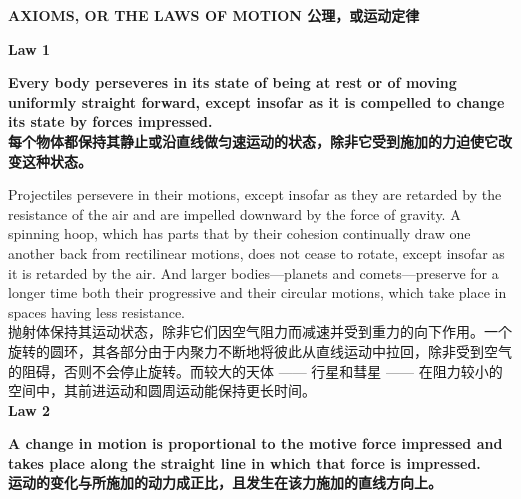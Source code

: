 \documentclass{article}
\begin{document}
\begin{center}
    \textbf{AXIOMS, OR THE LAWS OF MOTION 公理，或运动定律}
\end{center}

\noindent\textbf{Law 1}

\addtolength{\leftskip}{1cm}
\addtolength{\rightskip}{1cm}

\noindent \textbf{Every body perseveres in its state of being at rest or of moving uniformly straight forward, except insofar as it is compelled to change its state by forces impressed.}\\
\noindent \textbf{每个物体都保持其静止或沿直线做匀速运动的状态，除非它受到施加的力迫使它改变这种状态。}\\

\addtolength{\leftskip}{-1cm}
\addtolength{\rightskip}{-1cm}

\noindent Projectiles persevere in their motions, except insofar as they are retarded by the resistance of the air and are impelled downward by the force of gravity. A spinning hoop, which has parts that by their cohesion continually draw one another back from rectilinear motions, does not cease to rotate, except insofar as it is retarded by the air. And larger bodies—planets and comets—preserve for a longer time both their progressive and their circular motions, which take place in spaces having less resistance.\\
抛射体保持其运动状态，除非它们因空气阻力而减速并受到重力的向下作用。一个旋转的圆环，其各部分由于内聚力不断地将彼此从直线运动中拉回，除非受到空气的阻碍，否则不会停止旋转。而较大的天体 —— 行星和彗星 —— 在阻力较小的空间中，其前进运动和圆周运动能保持更长时间。\\

\noindent\textbf{Law 2}

\addtolength{\leftskip}{1cm}
\addtolength{\rightskip}{1cm}

\noindent \textbf{A change in motion is proportional to the motive force impressed and takes place along the straight line in which that force is impressed.}\\
\noindent \textbf{运动的变化与所施加的动力成正比，且发生在该力施加的直线方向上。}\\

\addtolength{\leftskip}{-1cm}
\addtolength{\rightskip}{-1cm}
\end{document}
